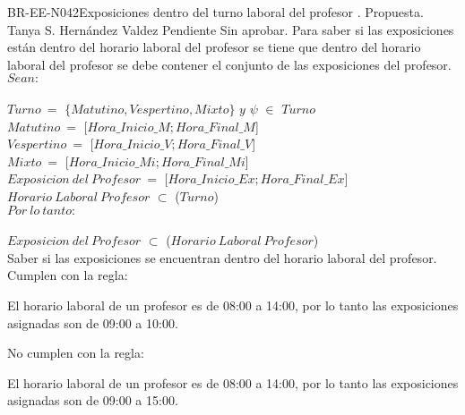 \begin{BusinessRule}{BR-EE-N042}{Exposiciones dentro del turno laboral del profesor}
	{\bcIntegridad}    %
	{\btEnabler}     %
	{\blControlling}    %
	.
	\BRItem[Estado] Propuesta.
	 Tanya S. Hernández Valdez
	 Pendiente
	 Sin aprobar.
	\BRItem[Descripción] Para saber si las exposiciones están dentro del horario laboral del profesor se tiene que dentro del horario laboral del profesor se debe contener el conjunto de las exposiciones del profesor. \\
	\BRItem[Sentencia] $Sean:$ \\\\
	$Turno\ =$ $\{Matutino, Vespertino, Mixto\}$ $y$ $\psi$ $\in$ $Turno$ \\
	$Matutino\ =$ [$Hora\_Inicio\_M; Hora\_Final\_M$] \\
	$Vespertino\ =$ [$Hora\_Inicio\_V; Hora\_Final\_V$] \\
	$Mixto\ =$ [$Hora\_Inicio\_Mi; Hora\_Final\_Mi$] \\
	$Exposicion\ del\ Profesor\ =$ [$Hora\_Inicio\_Ex; Hora\_Final\_Ex$] \\
	$Horario\ Laboral\ Profesor$ $\subset$ ($Turno$)\\
	$Por\ lo\ tanto:$ \\\\
	$Exposicion\ del\ Profesor$ $\subset$ ($Horario\ Laboral\ Profesor$) \\
	\BRItem[Motivación] Saber si las exposiciones se encuentran dentro del horario laboral del profesor. \\
	 Cumplen con la regla: \\
		\begin{Titemize}
			\Titem El horario laboral de un profesor es de 08:00 a 14:00, por lo tanto las exposiciones asignadas son de 09:00 a 10:00.
		\end{Titemize}	
	 No cumplen con la regla: \\
		\begin{Titemize}
			\Titem El horario laboral de un profesor es de 08:00 a 14:00, por lo tanto las exposiciones asignadas son de 09:00 a 15:00.
		\end{Titemize}	
\end{BusinessRule}

